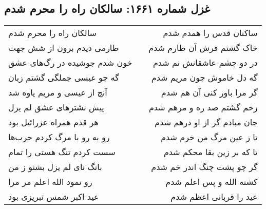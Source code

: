 \begin{center}
\section*{غزل شماره ۱۶۶۱: سالکان راه را محرم شدم}
\label{sec:1661}
\begin{longtable}{l p{0.5cm} r}
سالکان راه را محرم شدم
&&
ساکنان قدس را همدم شدم
\\
طارمی دیدم برون از شش جهت
&&
خاک گشتم فرش آن طارم شدم
\\
خون شدم جوشیده در رگ‌های عشق
&&
در دو چشم عاشقانش نم شدم
\\
گه چو عیسی جملگی گشتم زبان
&&
گه دل خاموش چون مریم شدم
\\
آنچ از عیسی و مریم یاوه شد
&&
گر مرا باور کنی آن هم شدم
\\
پیش نشترهای عشق لم یزل
&&
زخم گشتم صد ره و مرهم شدم
\\
هر قدم همراه عزرائیل بود
&&
جان مبادم گر از او درهم شدم
\\
رو به رو با مرگ کردم حرب‌ها
&&
تا ز عین مرگ من خرم شدم
\\
سست کردم تنگ هستی را تمام
&&
تا که بر زین بقا محکم شدم
\\
بانگ نای لم یزل بشنو ز من
&&
گر چو پشت چنگ اندر خم شدم
\\
رو نمود الله اعلم مر مرا
&&
کشته الله و پس اعلم شدم
\\
عید اکبر شمس تبریزی بود
&&
عید را قربانی اعظم شدم
\\
\end{longtable}
\end{center}
